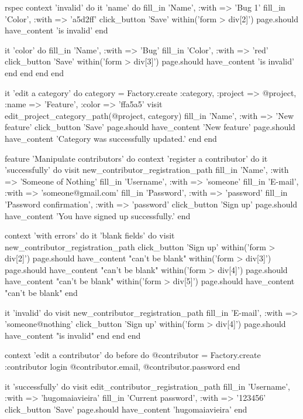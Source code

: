 \begin{mycode}{rspec}
      context 'invalid' do
        it 'name' do
          fill_in 'Name', :with => 'Bug 1'
          fill_in 'Color', :with => 'a5d2ff'
          click_button 'Save'
          within('form > div[2]') { page.should have_content 'is invalid' }
        end

        it 'color' do
          fill_in 'Name', :with => 'Bug'
          fill_in 'Color', :with => 'red'
          click_button 'Save'
          within('form > div[3]') { page.should have_content 'is invalid' }
        end
      end
    end
  end

  it 'edit a category' do
    category = Factory.create :category, :project => @project,
                                :name => 'Feature', :color => 'ffa5a5'
    visit edit_project_category_path(@project, category)
    fill_in 'Name', :with => 'New feature'
    click_button 'Save'
    page.should have_content 'New feature'
    page.should have_content 'Category was successfully updated.'
  end
end

feature 'Manipulate contributors' do
  context 'register a contributor' do
    it 'successfully' do
      visit new_contributor_registration_path
      fill_in 'Name', :with => 'Someone of Nothing'
      fill_in 'Username', :with => 'someone'
      fill_in 'E-mail', :with => 'someone@gmail.com'
      fill_in 'Password', :with => 'password'
      fill_in 'Password confirmation', :with => 'password'
      click_button 'Sign up'
      page.should have_content 'You have signed up successfully.'
    end

    context 'with errors' do
      it 'blank fields' do
        visit new_contributor_registration_path
        click_button 'Sign up'
        within('form > div[2]') { page.should have_content "can't be blank"}
        within('form > div[3]') { page.should have_content "can't be blank"}
        within('form > div[4]') { page.should have_content "can't be blank"}
        within('form > div[5]') { page.should have_content "can't be blank"}
      end

      it 'invalid' do
        visit new_contributor_registration_path
        fill_in 'E-mail', :with => 'someone@nothing'
        click_button 'Sign up'
        within('form > div[4]') { page.should have_content "is invalid"}
      end
    end
  end

  context 'edit a contributor' do
    before do
      @contributor = Factory.create :contributor
      login @contributor.email, @contributor.password
    end

    it 'successfully' do
      visit edit_contributor_registration_path
      fill_in 'Username', :with => 'hugomaiavieira'
      fill_in 'Current password', :with => '123456'
      click_button 'Save'
      page.should have_content 'hugomaiavieira'
    end


\end{mycode}
